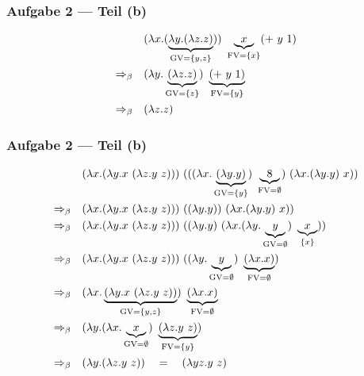 \documentclass{beamer}
\DeclareMathOperator{\GV}{GV}
\DeclareMathOperator{\FV}{FV}
\begin{document}
\begin{frame} \frametitle{Aufgabe 2 --- Teil (b)}
	\begin{align*}
		& (\lambda x . (\underbrace{\lambda y . (\lambda z . z)}_{\GV=\menge{y,z}})) \ \underbrace{x}_{\FV = \menge{x}} ( + \ y \ 1)
		\\
		\Rightarrow_\beta \quad
		& (\lambda y . \underbrace{(\lambda z . z)}_{\GV=\menge{z}}) \ \underbrace{( + \ y \ 1)}_{\FV = \menge{y}}
		\\
		\Rightarrow_\beta \quad
		& (\lambda z . z)
	\end{align*}
\end{frame}


\begin{frame} \frametitle{Aufgabe 2 --- Teil (b)}
	\begin{align*}
		& (\lambda x . (\lambda y . x \ (\lambda z . y \ z))) \ (((\lambda x . \underbrace{(\lambda y . y )}_{\GV= \menge{y}}) \ \underbrace{8}_{\FV = \emptyset} ) \ (\lambda x . (\lambda y . y) \ x ))
		\\
		\Rightarrow_\beta \quad
		& (\lambda x . (\lambda y . x \ (\lambda z . y \ z))) \ ((\lambda y . y )) \ (\lambda x . (\lambda y . y) \ x ))
		\\
		\Rightarrow_\beta \quad
		& (\lambda x . (\lambda y . x \ (\lambda z . y \ z))) \ ((\lambda y . y ) \ (\lambda x . (\lambda y . \underbrace{y}_{\GV=\emptyset}) \ \underbrace{x}_{\menge{x}} ))
		\\
		\Rightarrow_\beta \quad
		& (\lambda x . (\lambda y . x \ (\lambda z . y \ z))) \ ((\lambda y . \underbrace{y}_{\GV = \emptyset} ) \ \underbrace{(\lambda x . x)}_{\FV = \emptyset})
		\\
		\Rightarrow_\beta \quad
		& (\lambda x . \underbrace{(\lambda y . x \ (\lambda z . y \ z))}_{\GV = \menge{y,z}}) \ \underbrace{(\lambda x . x)}_{\FV = \emptyset}
		\\
		\Rightarrow_\beta \quad
		& (\lambda y . (\lambda x . \underbrace{x}_{\GV = \emptyset}) \ \underbrace{(\lambda z . y \ z)}_{\FV = \menge{y}})
		\\
		\Rightarrow_\beta \quad
		& (\lambda y . (\lambda z . y \ z)) 
		\quad = \quad
		(\lambda yz . y \ z) 
	\end{align*}
\end{frame}
\end{document}
